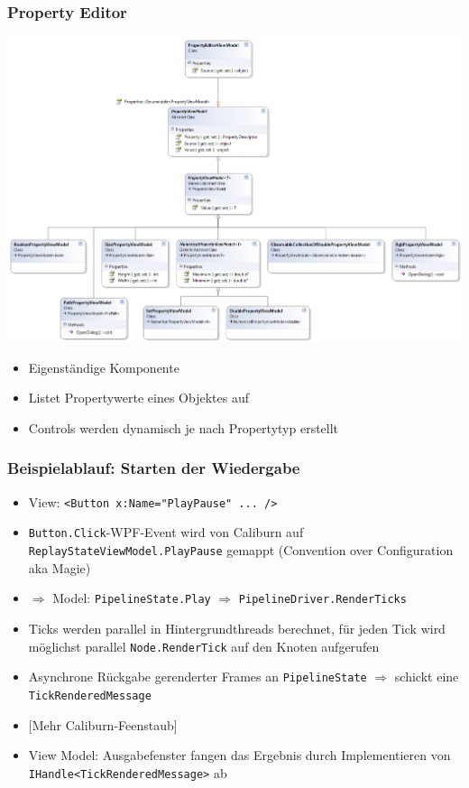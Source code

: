 \documentclass[t]{beamer}
\begin{document}
\begin{frame}
\frametitle{Property Editor}
\noindent
\begin{minipage}{6cm}
\includegraphics[height=0.9\textheight]{../YuvKA.ViewModel.PropertyEditor/propertyEditor.png}
\end{minipage}
\hfill
\begin{minipage}{5cm}
    \vspace{-2cm} %
    \begin{itemize}
        \item Eigenständige Komponente
        \item Listet Propertywerte eines Objektes auf
        \item Controls werden dynamisch je nach Propertytyp erstellt
    \end{itemize}
\end{minipage}
\end{frame}

\begin{frame}[fragile]
\frametitle{Beispielablauf: Starten der Wiedergabe}
\begin{itemize}[<+->]
    \item View: \verb!<Button x:Name="PlayPause" ... />!
    \item \verb!Button.Click!-WPF-Event wird von Caliburn auf \verb!ReplayStateViewModel.PlayPause! gemappt (Convention over Configuration aka Magie)
    \item $\Rightarrow$ Model: \verb!PipelineState.Play! $\Rightarrow$ \verb!PipelineDriver.RenderTicks!
    \item Ticks werden parallel in Hintergrundthreads berechnet, für jeden Tick wird möglichst parallel \verb!Node.RenderTick! auf den Knoten aufgerufen
    \item Asynchrone Rückgabe gerenderter Frames an \verb!PipelineState! $\Rightarrow$ schickt eine \verb!TickRenderedMessage!
    \item{[Mehr Caliburn-Feenstaub]}
    \item View Model: Ausgabefenster fangen das Ergebnis durch Implementieren von \verb!IHandle<TickRenderedMessage>! ab
\end{itemize}
\end{frame}
\end{document}
